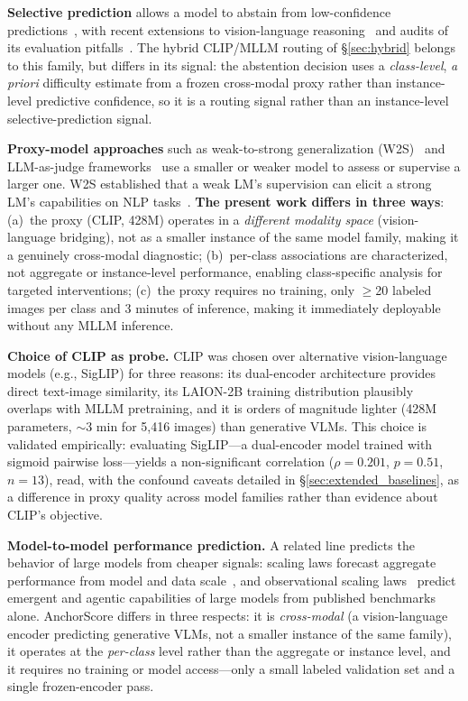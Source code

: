 \documentclass[11pt,a4paper]{article}
\begin{document}
\textbf{Selective prediction} allows a model to abstain from low-confidence predictions~\cite{geifman2017selective, elyaniv2010foundations}, with recent extensions to vision-language reasoning~\cite{srinivasan2024selective} and audits of its evaluation pitfalls~\cite{luth2024overcoming}. The hybrid CLIP/MLLM routing of \S\ref{sec:hybrid} belongs to this family, but differs in its signal: the abstention decision uses a \emph{class-level}, \emph{a priori} difficulty estimate from a frozen cross-modal proxy rather than instance-level predictive confidence, so it is a routing signal rather than an instance-level selective-prediction signal.

\textbf{Proxy-model approaches} such as weak-to-strong generalization (W2S)~\cite{burns2023weak} and LLM-as-judge frameworks~\cite{dubois2024lengthcontrolled, zheng2023judging} use a smaller or weaker model to assess or supervise a larger one. W2S established that a weak LM's supervision can elicit a strong LM's capabilities on NLP tasks~\cite{burns2023weak}. \textbf{The present work differs in three ways}: (a)~the proxy (CLIP, 428M) operates in a \emph{different modality space} (vision-language bridging), not as a smaller instance of the same model family, making it a genuinely cross-modal diagnostic; (b)~per-class associations are characterized, not aggregate or instance-level performance, enabling class-specific analysis for targeted interventions; (c)~the proxy requires no training, only $\geq$20 labeled images per class and 3 minutes of inference, making it immediately deployable without any MLLM inference.

\textbf{Choice of CLIP as probe.} CLIP was chosen over alternative vision-language models (e.g., SigLIP) for three reasons: its dual-encoder architecture provides direct text-image similarity, its LAION-2B training distribution plausibly overlaps with MLLM pretraining, and it is orders of magnitude lighter (428M parameters, $\sim$3 min for 5{,}416 images) than generative VLMs. This choice is validated empirically: evaluating SigLIP---a dual-encoder model trained with sigmoid pairwise loss---yields a non-significant correlation ($\rho=0.201$, $p=0.51$, $n=13$), read, with the confound caveats detailed in \S\ref{sec:extended_baselines}, as a difference in proxy quality across model families rather than evidence about CLIP's objective.

\textbf{Model-to-model performance prediction.} A related line predicts the behavior of large models from cheaper signals: scaling laws forecast aggregate performance from model and data scale~\cite{kaplan2020scaling,hoffmann2022training}, and observational scaling laws~\cite{ruan2024observational} predict emergent and agentic capabilities of large models from published benchmarks alone. AnchorScore differs in three respects: it is \emph{cross-modal} (a vision-language encoder predicting generative VLMs, not a smaller instance of the same family), it operates at the \emph{per-class} level rather than the aggregate or instance level, and it requires no training or model access---only a small labeled validation set and a single frozen-encoder pass.
\end{document}
